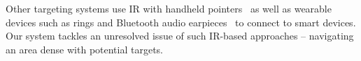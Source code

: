 Other targeting systems use IR with handheld pointers~\cite{swindells_that_2002} as well as wearable devices such as rings and Bluetooth audio earpieces~\cite{merrill_augmenting_2007} to connect to smart devices. Our system tackles an unresolved issue of such IR-based approaches -- navigating an area dense with potential targets.
